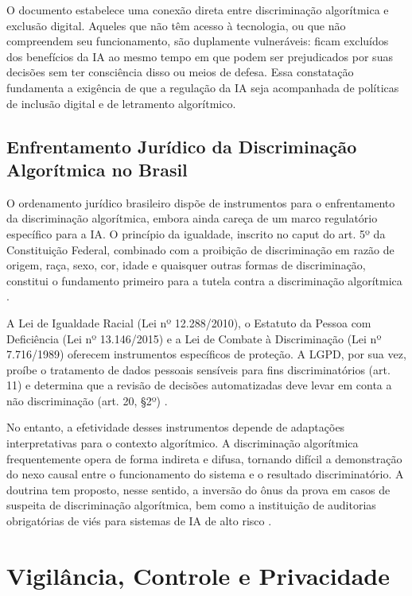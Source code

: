 O documento estabelece uma conexão direta entre discriminação algorítmica e exclusão digital. Aqueles que não têm acesso à tecnologia, ou que não compreendem seu funcionamento, são duplamente vulneráveis: ficam excluídos dos benefícios da IA ao mesmo tempo em que podem ser prejudicados por suas decisões sem ter consciência disso ou meios de defesa. Essa constatação fundamenta a exigência de que a regulação da IA seja acompanhada de políticas de inclusão digital e de letramento algorítmico.

\subsection{Enfrentamento Jurídico da Discriminação Algorítmica no Brasil}
\label{subsec:enfrentamento-juridico-brasil}

O ordenamento jurídico brasileiro dispõe de instrumentos para o enfrentamento da discriminação algorítmica, embora ainda careça de um marco regulatório específico para a IA. O princípio da igualdade, inscrito no caput do art. 5º da Constituição Federal, combinado com a proibição de discriminação em razão de origem, raça, sexo, cor, idade e quaisquer outras formas de discriminação, constitui o fundamento primeiro para a tutela contra a discriminação algorítmica \cite{Brasil1988CF}.

A Lei de Igualdade Racial (Lei nº 12.288/2010), o Estatuto da Pessoa com Deficiência (Lei nº 13.146/2015) e a Lei de Combate à Discriminação (Lei nº 7.716/1989) oferecem instrumentos específicos de proteção. A LGPD, por sua vez, proíbe o tratamento de dados pessoais sensíveis para fins discriminatórios (art. 11) e determina que a revisão de decisões automatizadas deve levar em conta a não discriminação (art. 20, §2º) \cite{Brasil2018LGPD}.

No entanto, a efetividade desses instrumentos depende de adaptações interpretativas para o contexto algorítmico. A discriminação algorítmica frequentemente opera de forma indireta e difusa, tornando difícil a demonstração do nexo causal entre o funcionamento do sistema e o resultado discriminatório. A doutrina tem proposto, nesse sentido, a inversão do ônus da prova em casos de suspeita de discriminação algorítmica, bem como a instituição de auditorias obrigatórias de viés para sistemas de IA de alto risco \cite{Wachter2017TSP, Selbst2018TIR}.

\section{Vigilância, Controle e Privacidade}
\label{sec:vigilancia}

